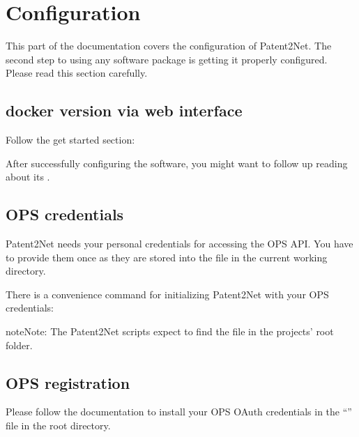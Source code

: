 \documentclass[letterpaper,10pt,english]{sphinxmanual}
\begin{document}
\section{Configuration}
\label{\detokenize{configure:configuration}}\label{\detokenize{configure:id1}}\label{\detokenize{configure::doc}}
This part of the documentation covers the configuration of Patent2Net.
The second step to using any software package is getting it properly configured.
Please read this section carefully.


\subsection{docker version via web interface}
\label{\detokenize{configure:docker-version-via-web-interface}}
Follow the get started section: 

After successfully configuring the software, you might want to
follow up reading about its {\hyperref[\detokenize{usage/index:usage}]{}}.


\subsection{OPS credentials}
\label{\detokenize{configure:ops-credentials}}
Patent2Net needs your personal credentials for accessing the OPS API.
You have to provide them once as they are stored into the file
 in the current working directory.

There is a convenience command for initializing Patent2Net with your OPS credentials:

\begin{sphinxVerbatim}[commandchars=\\\{\}]
    
\end{sphinxVerbatim}

\begin{sphinxadmonition}{note}{Note:}
The Patent2Net scripts expect to find the file  in the projects’ root folder.
\end{sphinxadmonition}


\subsection{OPS registration}
\label{\detokenize{configure:ops-registration}}
Please follow the  documentation to install your
OPS OAuth credentials in the “” file in the root directory.
\end{document}
